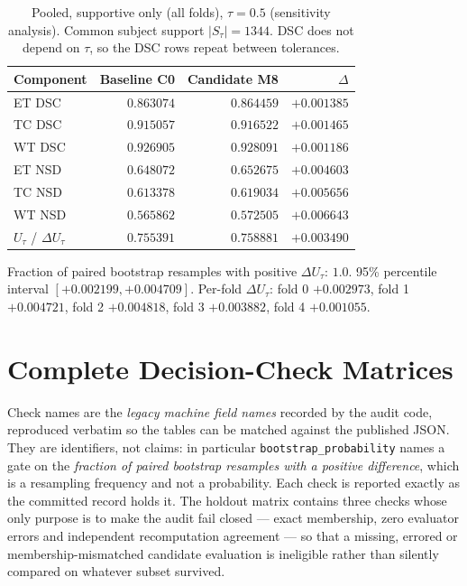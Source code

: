 \documentclass[runningheads]{llncs}
\begin{document}
\begin{table}[htbp]\centering
\caption{Pooled, supportive only (all folds), $\tau=0.5$ (sensitivity analysis). Common subject support $|S_\tau|=1344$. DSC does not
depend on $\tau$, so the DSC rows repeat between tolerances.}
\begin{tabular}{@{}lrrr@{}}
\toprule
Component & Baseline C0 & Candidate M8 & $\Delta$ \\
\midrule
ET DSC & $0.863074$ & $0.864459$ & $+0.001385$ \\
TC DSC & $0.915057$ & $0.916522$ & $+0.001465$ \\
WT DSC & $0.926905$ & $0.928091$ & $+0.001186$ \\
ET NSD & $0.648072$ & $0.652675$ & $+0.004603$ \\
TC NSD & $0.613378$ & $0.619034$ & $+0.005656$ \\
WT NSD & $0.565862$ & $0.572505$ & $+0.006643$ \\
\midrule
$U_\tau$ / $\Delta U_\tau$ & $0.755391$ & $0.758881$ & $+0.003490$ \\
\bottomrule
\end{tabular}
\par\medskip
\begin{minipage}{0.92\textwidth}\small Fraction of paired bootstrap resamples with positive $\Delta U_\tau$: $1.0$. 95\% percentile interval $[+0.002199,+0.004709]$. Per-fold $\Delta U_\tau$: fold 0 $+0.002973$, fold 1 $+0.004721$, fold 2 $+0.004818$, fold 3 $+0.003882$, fold 4 $+0.001055$.\end{minipage}
\end{table}

\section{Complete Decision-Check Matrices}

Check names are the \emph{legacy machine field names} recorded by the audit code, reproduced verbatim
so the tables can be matched against the published JSON. They are identifiers, not claims: in
particular \texttt{bootstrap\_probability} names a gate on the \emph{fraction of paired bootstrap
resamples with a positive difference}, which is a resampling frequency and not a probability. Each
check is reported exactly as the committed record holds it. The holdout matrix contains three
checks whose only purpose is to make the audit fail closed --- exact membership, zero evaluator
errors and independent recomputation agreement --- so that a missing, errored or
membership-mismatched candidate evaluation is ineligible rather than silently compared on whatever
subset survived.
\end{document}
